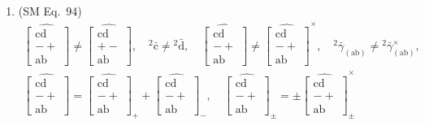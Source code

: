 \documentclass[12pt]{article}
\begin{document}
\begin{enumerate}[label=(\arabic*), series=formellist]
    \item (SM Eq.\ 94) 
    \[
    \begin{gathered}
    \widehat{\left[ \begin{smallmatrix} \mathrm{cd} \\ - + \\ \mathrm{ab} \end{smallmatrix} \right]} \ne \widehat{\left[ \begin{smallmatrix} \mathrm{cd} \\ + - \\ \mathrm{ab} \end{smallmatrix} \right]}, \quad {}^2\bar{\mathrm{c}} \ne {}^2\bar{\mathrm{d}}, \quad \widehat{\left[ \begin{smallmatrix} \mathrm{cd} \\ - + \\ \mathrm{ab} \end{smallmatrix} \right]} \ne \widehat{\left[ \begin{smallmatrix} \mathrm{cd} \\ - + \\ \mathrm{ab} \end{smallmatrix} \right]}^\times, \quad {}^2\bar{\gamma}_{(\mathrm{ab})} \ne {}^2\bar{\gamma}_{(\mathrm{ab})}^\times, \\
    \widehat{\left[ \begin{smallmatrix} \mathrm{cd} \\ - + \\ \mathrm{ab} \end{smallmatrix} \right]} = \widehat{\left[ \begin{smallmatrix} \mathrm{cd} \\ - + \\ \mathrm{ab} \end{smallmatrix} \right]}_+ + \widehat{\left[ \begin{smallmatrix} \mathrm{cd} \\ - + \\ \mathrm{ab} \end{smallmatrix} \right]}_-, \quad \widehat{\left[ \begin{smallmatrix} \mathrm{cd} \\ - + \\ \mathrm{ab} \end{smallmatrix} \right]}_\pm = \pm \widehat{\left[ \begin{smallmatrix} \mathrm{cd} \\ - + \\ \mathrm{ab} \end{smallmatrix} \right]}_\pm^\times
    \end{gathered}
    \]


\end{enumerate}
\end{document}
